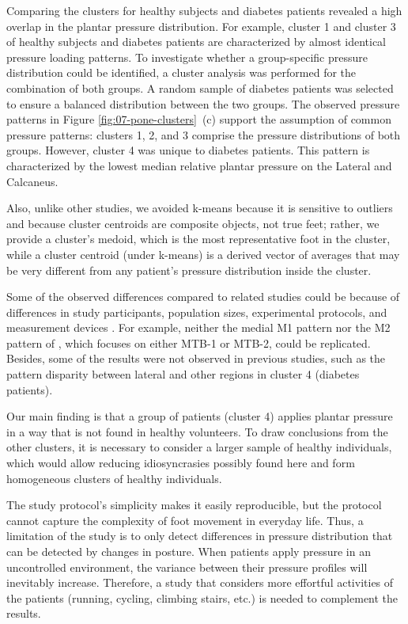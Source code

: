 \documentclass[
  oneside]{book}
\begin{document}
Comparing the clusters for healthy subjects and diabetes patients revealed a high overlap in the plantar pressure distribution.
For example, cluster 1 and cluster 3 of healthy subjects and diabetes patients are characterized by almost identical pressure loading patterns.
To investigate whether a group-specific pressure distribution could be identified, a cluster analysis was performed for the combination of both groups.
A random sample of diabetes patients was selected to ensure a balanced distribution between the two groups.
The observed pressure patterns in Figure \ref{fig:07-pone-clusters}~(c) support the assumption of common pressure patterns: clusters 1, 2, and 3 comprise the pressure distributions of both groups.
However, cluster 4 was unique to diabetes patients.
This pattern is characterized by the lowest median relative plantar pressure on the Lateral and Calcaneus.

Also, unlike other studies, we avoided k-means because it is sensitive to outliers and because cluster centroids are composite objects, not true feet; rather, we provide a cluster's medoid, which is the most representative foot in the cluster, while a cluster centroid (under k-means) is a derived vector of averages that may be very different from any patient's pressure distribution inside the cluster.

Some of the observed differences compared to related studies could be because of differences in study participants, population sizes, experimental protocols, and measurement devices \autocite{DeCockEtAl:FootTypeClusteringPlantarPressure2006,BennettsEtAl:Biomechanics2013,DeschampsEtAL:KMeansDiabeticFoot2013}.
For example, neither the medial M1 pattern nor the M2 pattern of \autocite{DeCockEtAl:FootTypeClusteringPlantarPressure2006}, which focuses on either MTB-1 or MTB-2, could be replicated.
Besides, some of the results were not observed in previous studies, such as the pattern disparity between lateral and other regions in cluster 4 (diabetes patients).

Our main finding is that a group of patients (cluster 4) applies plantar pressure in a way that is not found in healthy volunteers.
To draw conclusions from the other clusters, it is necessary to consider a larger sample of healthy individuals, which would allow reducing idiosyncrasies possibly found here and form homogeneous clusters of healthy individuals.

The study protocol's simplicity makes it easily reproducible, but the protocol cannot capture the complexity of foot movement in everyday life.
Thus, a limitation of the study is to only detect differences in pressure distribution that can be detected by changes in posture.
When patients apply pressure in an uncontrolled environment, the variance between their pressure profiles will inevitably increase.
Therefore, a study that considers more effortful activities of the patients (running, cycling, climbing stairs, etc.) is needed to complement the results.
\end{document}
